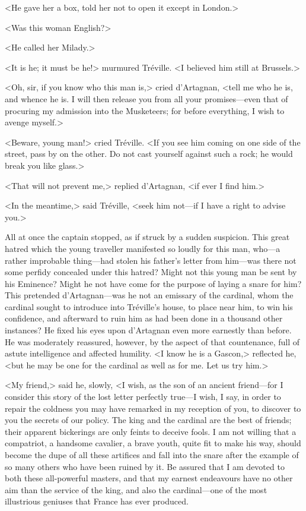 <He gave her a box, told her not to open it except in London.> 

<Was this woman English?> 

<He called her Milady.> 

<It is he; it must be he!> murmured Tréville. <I believed him still at Brussels.> 

<Oh, sir, if you know who this man is,> cried d'Artagnan, <tell me who he is, and whence he is. I will then release you from all your promises---even that of procuring my admission into the Musketeers; for before everything, I wish to avenge myself.> 

<Beware, young man!> cried Tréville. <If you see him coming on one side of the street, pass by on the other. Do not cast yourself against such a rock; he would break you like glass.> 

<That will not prevent me,> replied d'Artagnan, <if ever I find him.> 

<In the meantime,> said Tréville, <seek him not---if I have a right to advise you.> 

All at once the captain stopped, as if struck by a sudden suspicion. This great hatred which the young traveller manifested so loudly for this man, who---a rather improbable thing---had stolen his father's letter from him---was there not some perfidy concealed under this hatred? Might not this young man be sent by his Eminence? Might he not have come for the purpose of laying a snare for him? This pretended d'Artagnan---was he not an emissary of the cardinal, whom the cardinal sought to introduce into Tréville's house, to place near him, to win his confidence, and afterward to ruin him as had been done in a thousand other instances? He fixed his eyes upon d'Artagnan even more earnestly than before. He was moderately reassured, however, by the aspect of that countenance, full of astute intelligence and affected humility. <I know he is a Gascon,> reflected he, <but he may be one for the cardinal as well as for me. Let us try him.> 

<My friend,> said he, slowly, <I wish, as the son of an ancient friend---for I consider this story of the lost letter perfectly true---I wish, I say, in order to repair the coldness you may have remarked in my reception of you, to discover to you the secrets of our policy. The king and the cardinal are the best of friends; their apparent bickerings are only feints to deceive fools. I am not willing that a compatriot, a handsome cavalier, a brave youth, quite fit to make his way, should become the dupe of all these artifices and fall into the snare after the example of so many others who have been ruined by it. Be assured that I am devoted to both these all-powerful masters, and that my earnest endeavours have no other aim than the service of the king, and also the cardinal---one of the most illustrious geniuses that France has ever produced.

